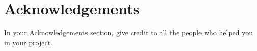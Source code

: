 \documentclass[]{UCD_CS_FYP_Report}
\begin{document}



%


\chapter*{Acknowledgements}
In your Acknowledgements section, give credit to all the people who helped you in your project.


\printbibliography


\end{document}
